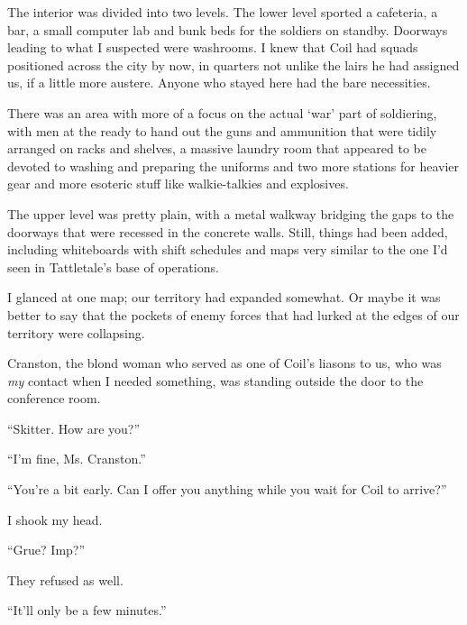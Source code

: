 The interior was divided into two levels.  The lower level sported a cafeteria, a bar, a small computer lab and bunk beds for the soldiers on standby.  Doorways leading to what I suspected were washrooms.  I knew that Coil had squads positioned across the city by now, in quarters not unlike the lairs he had assigned us, if a little more austere.  Anyone who stayed here had the bare necessities.



There was an area with more of a focus on the actual `war' part of soldiering, with men at the ready to hand out the guns and ammunition that were tidily arranged on racks and shelves, a massive laundry room that appeared to be devoted to washing and preparing the uniforms and two more stations for heavier gear and more esoteric stuff like walkie-talkies and explosives.



The upper level was pretty plain, with a metal walkway bridging the gaps to the doorways that were recessed in the concrete walls.  Still, things had been added, including whiteboards with shift schedules and maps very similar to the one I'd seen in Tattletale's base of operations.



I glanced at one map; our territory had expanded somewhat.  Or maybe it was better to say that the pockets of enemy forces that had lurked at the edges of our territory were collapsing.



Cranston, the blond woman who served as one of Coil's liasons to us, who was \emph{my} contact when I needed something, was standing outside the door to the conference room.



``Skitter.  How are you?''



``I'm fine, Ms. Cranston.''



``You're a bit early.  Can I offer you anything while you wait for Coil to arrive?''



I shook my head.



``Grue?  Imp?''



They refused as well.



``It'll only be a few minutes.''



